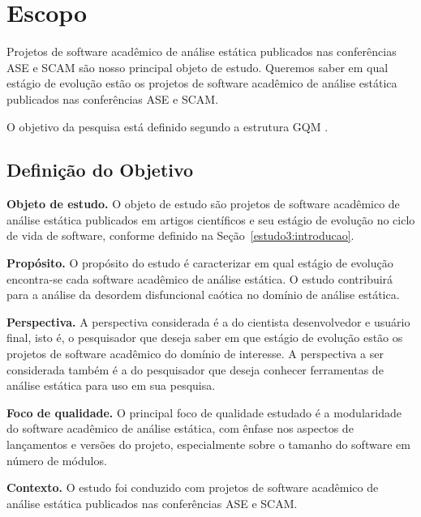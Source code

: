 \section{Escopo} \label{estudo3:escopo} %

Projetos de software acadêmico de análise estática publicados nas 
conferências ASE e SCAM 
são nosso principal objeto de estudo.
Queremos saber em qual estágio de evolução estão os projetos de software
acadêmico de análise estática publicados nas conferências ASE e SCAM.

O objetivo da pesquisa está definido segundo a estrutura GQM \cite{basili1994goal}.

\subsection{Definição do Objetivo}

\begin{description}

  \item{\bf Objeto de estudo.}
    O objeto de estudo são projetos de software acadêmico de análise estática
    publicados em artigos científicos e seu estágio de evolução no ciclo de
    vida de software, conforme definido na Seção~\ref{estudo3:introducao}.

  \item{\bf Propósito.}
    O propósito do estudo é caracterizar em qual estágio de evolução
    encontra-se cada software acadêmico de análise estática. O estudo
    contribuirá para a análise da desordem disfuncional caótica no domínio de
    análise estática. 

  \item{\bf Perspectiva.}
    A perspectiva considerada é a do cientista desenvolvedor e usuário final, isto é, o pesquisador
    que deseja saber em que estágio de evolução estão os projetos de software acadêmico do domínio
    de interesse. A perspectiva a ser considerada também é a do pesquisador que deseja
    conhecer ferramentas de análise estática para uso em sua pesquisa.

  \item{\bf Foco de qualidade.}
    O principal foco de qualidade estudado é a modularidade do software
    acadêmico de análise estática, com ênfase nos aspectos de lançamentos e
    versões do projeto, especialmente sobre o tamanho do software em número de
    módulos.

  \item{\bf Contexto.}
    O estudo foi conduzido com projetos de software acadêmico de análise
    estática publicados nas conferências ASE e SCAM.

\end{description}

